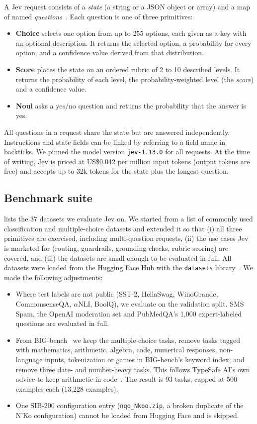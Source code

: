 \documentclass[table]{article}
\begin{document}
A Jev request consists of a \emph{state} (a string or a JSON object or array) and a map of named \emph{questions}~\cite{typesafe2026jev}. Each question is one of three primitives:
\begin{itemize}[leftmargin=*,noitemsep]
    \item \textbf{Choice} selects one option from up to 255 options, each given as a key with an optional description. It returns the selected option, a probability for every option, and a confidence value derived from that distribution.
    \item \textbf{Score} places the state on an ordered rubric of 2 to 10 described levels. It returns the probability of each level, the probability-weighted level (the \emph{score}) and a confidence value.
    \item \textbf{Noul} asks a yes/no question and returns the probability that the answer is yes.
\end{itemize}
All questions in a request share the state but are answered independently. Instructions and state fields can be linked by referring to a field name in backticks. We pinned the model version \texttt{jev-1.13.0} for all requests. At the time of writing, Jev is priced at US\$0.042 per million input tokens (output tokens are free) and accepts up to 32k tokens for the state plus the longest question.

\subsection{Benchmark suite}

 lists the 37 datasets we evaluate Jev on. We started from a list of commonly used classification and multiple-choice datasets and extended it so that (i) all three primitives are exercised, including multi-question requests, (ii) the use cases Jev is marketed for (routing, guardrails, grounding checks, rubric scoring) are covered, and (iii) the datasets are small enough to be evaluated in full. All datasets were loaded from the Hugging Face Hub with the \texttt{datasets} library~\cite{lhoest-etal-2021-datasets}. We made the following adjustments:
\begin{itemize}[leftmargin=*,noitemsep]
    \item Where test labels are not public (SST-2, HellaSwag, WinoGrande, CommonsenseQA, $\alpha$NLI, BoolQ), we evaluate on the validation split. SMS Spam, the OpenAI moderation set and PubMedQA's 1{,}000 expert-labeled questions are evaluated in full.
    \item From BIG-bench~\cite{srivastava2023beyond} we keep the multiple-choice tasks, remove tasks tagged with mathematics, arithmetic, algebra, code, numerical responses, non-language inputs, tokenization or games in BIG-bench's keyword index, and remove three date- and number-heavy tasks. This follows TypeSafe AI's own advice to keep arithmetic in code~\cite{typesafe2026jev}. The result is 93 tasks, capped at 500 examples each (13{,}228 examples).
    \item One SIB-200 configuration entry (\texttt{nqo\_Nkoo.zip}, a broken duplicate of the N'Ko configuration) cannot be loaded from Hugging Face and is skipped.
\end{itemize}
\end{document}
